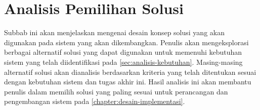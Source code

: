 \section{Analisis Pemilihan Solusi}
\label{sec:analisis-pemilihan-solusi}

Subbab ini akan menjelaskan mengenai desain konsep solusi yang akan digunakan pada sistem yang akan dikembangkan. Penulis akan mengeksplorasi berbagai alternatif solusi yang dapat digunakan untuk memenuhi kebutuhan sistem yang telah diidentifikasi pada \autoref{sec:analisis-kebutuhan}. Masing-masing alternatif solusi akan dianalisis berdasarkan kriteria yang telah ditentukan sesuai dengan kebutuhan sistem dan tugas akhir ini. Hasil analisis ini akan membantu penulis dalam memilih solusi yang paling sesuai untuk perancangan dan pengembangan sistem pada \autoref{chapter:desain-implementasi}.

